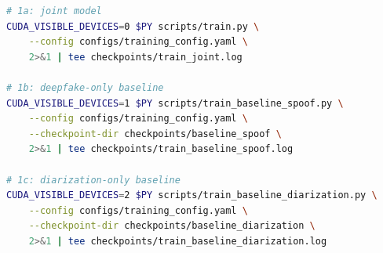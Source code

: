 \documentclass{article}
\begin{document}
\begin{lstlisting}[language=bash,caption={Phase 1: train the three primary systems on separate GPUs.}]
# 1a: joint model
CUDA_VISIBLE_DEVICES=0 $PY scripts/train.py \
    --config configs/training_config.yaml \
    2>&1 | tee checkpoints/train_joint.log

# 1b: deepfake-only baseline
CUDA_VISIBLE_DEVICES=1 $PY scripts/train_baseline_spoof.py \
    --config configs/training_config.yaml \
    --checkpoint-dir checkpoints/baseline_spoof \
    2>&1 | tee checkpoints/train_baseline_spoof.log

# 1c: diarization-only baseline
CUDA_VISIBLE_DEVICES=2 $PY scripts/train_baseline_diarization.py \
    --config configs/training_config.yaml \
    --checkpoint-dir checkpoints/baseline_diarization \
    2>&1 | tee checkpoints/train_baseline_diarization.log
\end{lstlisting}
\end{document}
